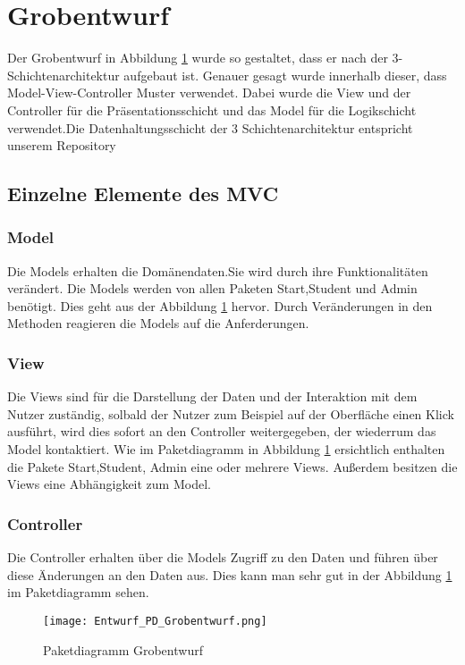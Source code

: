 \documentclass[a4paper,10pt]{article}
\begin{document}
\section{Grobentwurf}
Der Grobentwurf in Abbildung \ref{fig:Paketdiagramm_Grobentwurf} wurde so gestaltet, dass er nach der 3-Schichtenarchitektur aufgebaut ist. Genauer gesagt wurde innerhalb dieser, dass Model-View-Controller Muster verwendet. 
Dabei wurde die View und der Controller für die Präsentationsschicht und das Model für die Logikschicht verwendet.Die Datenhaltungsschicht der 3 Schichtenarchitektur entspricht unserem Repository

\subsection{Einzelne Elemente des MVC}
  \subsubsection{Model} 
    Die Models erhalten die Domänendaten.Sie wird durch ihre Funktionalitäten verändert. Die Models werden von allen Paketen Start,Student und Admin ben\"otigt. Dies geht aus der Abbildung \ref{fig:Paketdiagramm_Grobentwurf} hervor.
    Durch Ver\"anderungen in den Methoden reagieren die Models auf die Anferderungen.
   \subsubsection{View}
   Die Views sind für die Darstellung der Daten und der Interaktion mit dem Nutzer zuständig, solbald der Nutzer zum Beispiel auf der Oberfläche einen Klick ausführt, wird dies sofort an den Controller weitergegeben, der wiederrum das Model kontaktiert.
   Wie im Paketdiagramm in  Abbildung \ref{fig:Paketdiagramm_Grobentwurf} ersichtlich enthalten die Pakete Start,Student, Admin eine oder mehrere Views.
   Au\ss{}erdem besitzen die Views eine Abh\"angigkeit zum Model.
   \subsubsection{Controller}
   Die Controller erhalten über die Models Zugriff zu den Daten und führen über diese Änderungen an den Daten aus. Dies kann man sehr gut in der Abbildung \ref{fig:Paketdiagramm_Grobentwurf} im Paketdiagramm sehen.
   
   \begin{figure}
    \texttt{[image: Entwurf\_PD\_Grobentwurf.png]}
    \label{fig:Paketdiagramm_Grobentwurf}
    \caption{Paketdiagramm Grobentwurf}
   \end{figure} 
\end{document}
